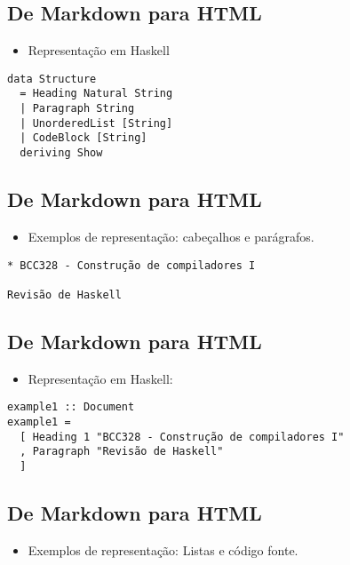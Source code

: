 \documentclass[11pt]{article}
\begin{document}
\subsection*{De Markdown para HTML}
\label{sec:org2c593f2}

\begin{itemize}
\item Representação em Haskell
\end{itemize}

\begin{verbatim}
data Structure
  = Heading Natural String
  | Paragraph String
  | UnorderedList [String] 
  | CodeBlock [String]
  deriving Show
\end{verbatim}
\subsection*{De Markdown para HTML}
\label{sec:org368c072}

\begin{itemize}
\item Exemplos de representação: cabeçalhos e parágrafos.
\end{itemize}

\begin{verbatim}
* BCC328 - Construção de compiladores I

Revisão de Haskell
\end{verbatim}
\subsection*{De Markdown para HTML}
\label{sec:org0e07c34}

\begin{itemize}
\item Representação em Haskell:
\end{itemize}

\begin{verbatim}
example1 :: Document
example1 =
  [ Heading 1 "BCC328 - Construção de compiladores I"
  , Paragraph "Revisão de Haskell"
  ]
\end{verbatim}
\subsection*{De Markdown para HTML}
\label{sec:orgbadb732}

\begin{itemize}
\item Exemplos de representação: Listas e código fonte.
\end{itemize}
\end{document}
